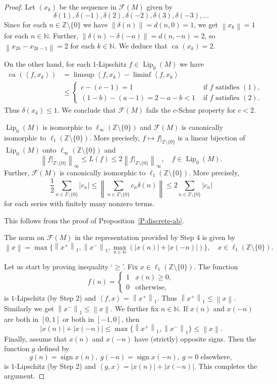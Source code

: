 \documentclass{amsart}
\numberwithin{equation}{section}
\theoremstyle{definition}
\def\F{\mathcal F}
\def\en{\mathbb N}
\def\zet{\mathbb Z}
\def \sign{\operatorname{sign}}
\def \Lip {\operatorname{Lip}}
\def\ip#1#2{\left\langle#1,#2\right\rangle}
\def\de#1{\delta\left(#1\right)}
\newcommand{\norm}[1]{\left\|#1\right\|}
\newcommand{\ca}[2][]{\operatorname{ca}_{#1}\left(#2\right)}
\newcommand{\abs}[1]{\left|#1\right|}
\begin{document}
\begin{proof}
\smallskip

Let $(x_k)$ be the sequence in $\F(M)$ given by
$$\delta(1),\delta(-1),\delta(2),\delta(-2),\delta(3),\delta(-3),\dots$$
Since for each $n\in\zet\setminus\{0\}$ we have $\norm{\delta(n)}=d(n,0)=1$, we get $\norm{x_k}=1$ for each $n\in\en$. Further, $\norm{\delta(n)-\delta(-n)}=d(n,-n)=2$, so $\norm{x_{2k}-x_{2k-1}}=2$ for each $k\in\en$.
We deduce that $\ca{x_k}=2$.

On the other hand, for each $1$-Lipschitz $f\in \Lip_0(M)$ we have
$$\begin{aligned}
    \ca{\ip{f}{x_k}}&=\limsup \ip{f}{x_k}-\liminf \ip{f}{x_k}
    \\ &\le \begin{cases}
     c-(c-1)=1 & \mbox{ if $f$ satisfies }(1),\\
     (1-b)-(a-1) =2-a-b<1 &\mbox{ if $f$ satisfies }(2).
\end{cases}\end{aligned}$$
Thus $\de{x_k}\le 1$. We conclude that $\F(M)$ fails the $c$-Schur property for $c<2$.


\smallskip

 $\Lip_0(M)$ is isomorphic to $\ell_\infty(\zet\setminus\{0\})$ and $\F(M)$ is canonically isomorphic to $\ell_1(\zet\setminus\{0\})$. More precisely, $f\mapsto f|_{\zet\setminus\{0\}}$ is a linear bijection of $\Lip_0(M)$ onto $\ell_\infty(\zet\setminus\{0\})$ and
$$\norm{f|_{\zet\setminus\{0\}}}_\infty\le L(f)\le 2 \norm{f|_{\zet\setminus\{0\}}}_\infty,\quad f\in \Lip_0(M).$$
Further, $\F(M)$ is canonically isomorphic to $\ell_1(\zet\setminus\{0\})$. More precisely,
$$\frac12\sum_{n\in \zet\setminus\{0\}}\abs{c_n}\le \norm{\sum_{n\in\zet\setminus\{0\}} c_n\delta(n)}\le 2\sum_{n\in \zet\setminus\{0\}}\abs{c_n}$$
for each series with finitely many nonzero terms.

\smallskip

This follows from the proof of Proposition~\ref{P:discrete-ab}.

\smallskip

 The norm on $\F(M)$ in the representation provided by Step 4 is given by $$\norm{x}=\max\{\norm{x^+}_1,\norm{x^-}_1,\max_{n\in\en} (\abs{x(n)}+\abs{x(-n)})\}, \quad x\in \ell_1(\zet\setminus\{0\}).$$

\smallskip

Let us start by proving inequality `$\ge$'. Fix $x\in\ell_1(\zet\setminus\{0\})$.
The function 
$$f(n)=\begin{cases}
    1 & x(n)\ge 0,\\ 0&\mbox{otherwise},
\end{cases}$$
is $1$-Lipschitz (by Step 2) and $\ip{f}{x}=\norm{x^+}_1$. Thus $\norm{x^+}_1\le \norm{x}$. Similarly we get $\norm{x^-}_1\le \norm{x}$. We further fix $n\in\en$. If $x(n)$ and $x(-n)$ are both in $[0,1]$ or both in $[-1,0]$, then
$$\abs{x(n)}+\abs{x(-n)}\le \max\{\norm{x^+}_1,\norm{x^-}_1\}\le\norm {x}.$$
Finally, assume that $x(n)$ and $x(-n)$ have (strictly) opposite signs. Then the function $g$ defined by
$$g(n)=\sign x(n),\ g(-n)=\sign x(-n),\ g=0\mbox{ elsewhere},$$
is $1$-Lipschitz (by Step 2) and $\ip{g}{x}=\abs{x(n)}+\abs{x(-n)}$. This completes the argument.


\end{proof}
\end{document}
